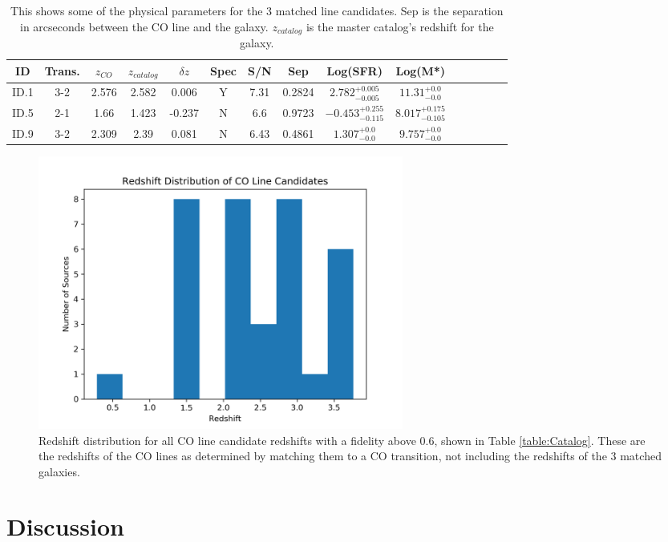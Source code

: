 \begin{table}
\caption{This shows some of the physical parameters for the 3 matched line candidates. Sep is the separation in arcseconds between the CO line and the galaxy. $z_{catalog}$ is the master catalog's redshift for the galaxy.}
\begin{tabular}{ccccccccccccccc}
ID & Trans. & $z_{CO}$ & $z_{catalog}$ & $\delta z$ & Spec & S/N & Sep & Log(SFR) & Log(M*) \\
\hline
ID.1 & 3-2 & 2.576 & 2.582 & 0.006 & Y & 7.31 & 0.2824 & $2.782_{-0.005}^{+0.005}$ & $11.31_{-0.0}^{+0.0}$  \\
ID.5 & 2-1 & 1.66 & 1.423 & -0.237 & N & 6.6 & 0.9723 & $-0.453_{-0.115}^{+0.255}$ & $8.017_{-0.105}^{+0.175}$ \\
ID.9 & 3-2 & 2.309 & 2.39 & 0.081 & N & 6.43 & 0.4861 & $1.307_{-0.0}^{+0.0}$ & $9.757_{-0.0}^{+0.0}$ \\
\end{tabular}\label{table:matched_gal}
\end{table}

\begin{figure}[!htbp]
\centering \includegraphics[width=120mm]{Survey/redshift_catalog.png}
\caption{Redshift distribution for all CO line candidate redshifts with a fidelity above 0.6, shown in Table \ref{table:Catalog}. These are the redshifts of the CO lines as determined by matching them to a CO transition, not including the redshifts of the 3 matched galaxies.}
\label{fig:cat_red}
\end{figure}

\section{Discussion}

